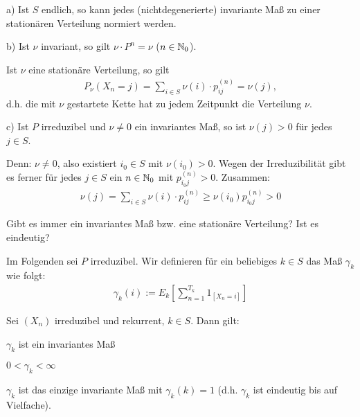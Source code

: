 \documentclass[a4paper,twoside,DIV15,BCOR12mm]{scrbook}
\begin{document}
\begin{bemerkung}
  a) Ist $S$ endlich, so kann jedes (nichtdegenerierte) invariante Maß zu einer stationären Verteilung normiert werden.

  b) Ist $\nu$ invariant, so gilt $\nu \cdot P^n = \nu$ ($n \in \mathbb{N}_0$).

  Ist $\nu$ eine stationäre Verteilung, so gilt
  \begin{align*}
    P_\nu(X_n = j) = \sum_{i \in S} \nu(i) \cdot p_{ij}^{(n)} = \nu(j),
  \end{align*}
  d.h. die mit $\nu$ gestartete Kette hat zu jedem Zeitpunkt die Verteilung $\nu$.

  c) Ist $P$ irreduzibel und $\nu \neq 0$ ein invariantes Maß, so ist $\nu(j) > 0$ für jedes $j\in S$.

  Denn: $\nu \neq 0$, also existiert $i_0 \in S$ mit $\nu(i_0) > 0$.
  Wegen der Irreduzibilität gibt es ferner für jedes $j \in S$ ein $n \in \mathbb{N}_0$ mit $p_{i_0j}^{(n)} > 0$. Zusammen:
  \begin{align*}
    \nu(j) = \sum_{i \in S} \nu(i) \cdot p_{ij}^{(n)} \geq \nu(i_0) p_{i_0j}^{(n)} > 0
  \end{align*}
\end{bemerkung}


Gibt es immer ein invariantes Maß bzw. eine stationäre Verteilung? Ist es eindeutig?

Im Folgenden sei $P$ irreduzibel. Wir definieren für ein beliebiges $k \in S$ das Maß $\gamma_k$ wie folgt:
\begin{align*}
  \gamma_k(i) := E_k[\sum_{n=1}^{T_k} 1_{[X_n = i]}]
\end{align*}


\begin{satz}
\label{satz3.1}
  Sei $(X_n)$ irreduzibel und rekurrent, $k \in S$. Dann gilt:
  \begin{enuma}
  \item $\gamma_k$ ist ein invariantes Maß
  \item $0 < \gamma_k < \infty$
  \item $\gamma_k$ ist das einzige invariante Maß mit $\gamma_k(k) = 1$ (d.h. $\gamma_k$ ist eindeutig bis auf Vielfache).
  \end{enuma}
\end{satz}
\end{document}
